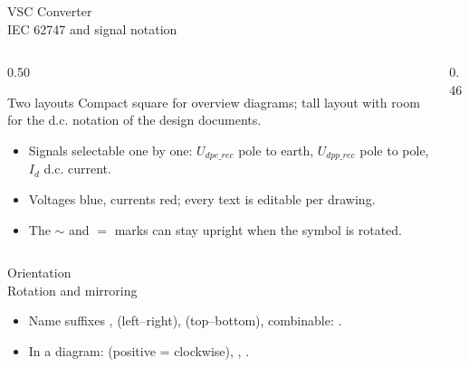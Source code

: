 \begin{frame}{VSC Converter\\IEC 62747 and signal notation}
  \begin{columns}[T,onlytextwidth]
    \begin{column}{0.50\textwidth}
      \begin{block}{Two layouts}
        Compact square for overview diagrams; tall layout with room for the d.c. notation of the design documents.
      \end{block}
      \vspace{0.3em}
      \begin{itemize}
        \setlength{\itemsep}{0.4em}
        \item Signals selectable one by one: $U_{dpe\_rec}$ pole to earth, $U_{dpp\_rec}$ pole to pole, $I_{d}$ d.c. current.
        \item Voltages blue, currents red; every text is editable per drawing.
        \item The $\sim$ and $=$ marks can stay upright when the symbol is rotated.
      \end{itemize}
    \end{column}
    \begin{column}{0.46\textwidth}
      \centering
    \end{column}
  \end{columns}
\end{frame}


\begin{frame}{Orientation\\Rotation and mirroring}
  \vspace{0.8em}

  \centering

  \vspace{0.6em}
  \raggedright
  \begin{itemize}
    \setlength{\itemsep}{0.4em}
    \item Name suffixes ,  (left--right),  (top--bottom), combinable: .
    \item In a diagram:  (positive = clockwise), , .
  \end{itemize}
\end{frame}


